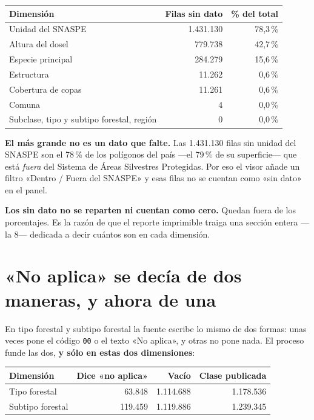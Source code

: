 \documentclass[11pt,a4paper]{report}
\newcommand{\campo}[1]{\textcolor{conaf}{\textbf{#1}}}
\newcommand{\orig}[1]{\texttt{\small #1}}
\begin{document}
\begin{center}
\begin{tabular}{@{}lrr@{}}
\toprule
\textbf{Dimensión} & \textbf{Filas sin dato} & \textbf{\% del total}\\
\midrule
Unidad del SNASPE & 1.431.130 & 78,3\,\%\\
Altura del dosel & 779.738 & 42,7\,\%\\
Especie principal & 284.279 & 15,6\,\%\\
Estructura & 11.262 & 0,6\,\%\\
Cobertura de copas & 11.261 & 0,6\,\%\\
Comuna & 4 & 0,0\,\%\\
Subclase, tipo y subtipo forestal, región & 0 & 0,0\,\%\\
\bottomrule
\end{tabular}
\end{center}

\begin{nota}
\campo{El más grande no es un dato que falte.} Las 1.431.130 filas sin unidad
del SNASPE son el 78\,\% de los polígonos del país —el 79\,\% de su superficie—
que está \emph{fuera} del Sistema de Áreas Silvestres Protegidas. Por eso el
visor añade un filtro «Dentro / Fuera del SNASPE» y esas filas no se cuentan
como «sin dato» en el panel.
\end{nota}

\begin{alerta}
\campo{Los sin dato no se reparten ni cuentan como cero.} Quedan fuera de los
porcentajes. Es la razón de que el reporte imprimible traiga una sección entera
—la 8— dedicada a decir cuántos son en cada dimensión.
\end{alerta}

\section{«No aplica» se decía de dos maneras, y ahora de una}

En tipo forestal y subtipo forestal la fuente escribe lo mismo de dos formas:
unas veces pone el código \orig{00} o el texto «No aplica», y otras no pone
nada. El proceso funde las dos, \campo{y sólo en estas dos dimensiones}:

\begin{center}
\begin{tabular}{@{}lrrr@{}}
\toprule
\textbf{Dimensión} & \textbf{Dice «no aplica»} & \textbf{Vacío} & \textbf{Clase publicada}\\
\midrule
Tipo forestal & 63.848 & 1.114.688 & 1.178.536\\
Subtipo forestal & 119.459 & 1.119.886 & 1.239.345\\
\bottomrule
\end{tabular}
\end{center}
\end{document}
